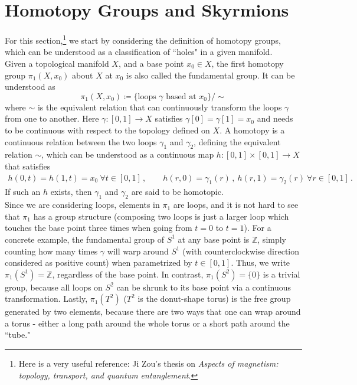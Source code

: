 \documentclass[11pt, onesided]{book}
\theoremstyle{break}
\theoremstyle{break}
\newcommand{\Z}{\mathbb{Z}}
\begin{document}
\section{Homotopy Groups and Skyrmions}
For this section,\footnote{Here is a very useful reference: Ji Zou's thesis on \textit{Aspects of magnetism: topology, transport, and quantum entanglement}.} we start by considering the definition of homotopy groups, which can be understood as a classification of ``holes" in a given manifold.\\

Given a topological manifold $X$, and a base point $x_0 \in X$, the first homotopy group $\pi_1(X,x_0)$ about $X$ at $x_0$ is also called the fundamental group. It can be understood as 
$$\pi_1(X,x_0)\coloneqq \{\text{loops\ }\gamma \text{ based at }x_0\} / \sim$$
where $\sim$ is the equivalent relation that can continuously transform the loops $\gamma$ from one to another. Here $\gamma:[0,1]\to X$ satisfies $\gamma[0] = \gamma[1] = x_0$ and needs to be continuous with respect to the topology defined on $X$. A homotopy is a continuous relation between the two loops $\gamma_1$ and $\gamma_2$, defining the equivalent relation $\sim$, which can be understood as a continuous map $h:[0,1]\times [0,1] \to X$ that satisfies
\begin{align*}
h(0,t)=h(1,t) = x_0 \ \forall t \in [0,1]\,,\qquad
h(r,0) = \gamma_1(r) \,,\ h(r,1) = \gamma_2(r)\ \forall r \in [0,1]\,.
\end{align*}
If such an $h$ exists, then $\gamma_1$ and $\gamma_2$ are said to be homotopic.\\

Since we are considering loops, elements in $\pi_1$ are loops, and it is not hard to see that $\pi_1$ has a group structure (composing two loops is just a larger loop which touches the base point three times when going from $t = 0$ to $t = 1$). For a concrete example, the fundamental group of $S^1$ at any base point is $\Z$, simply counting how many times $\gamma$ will warp around $S^1$ (with counterclockwise direction considered as positive count) when parametrized by $t \in [0,1]$. Thus, we write $\pi_1(S^1) = \Z$, regardless of the base point. In contrast, $\pi_1(S^2) = \{0\}$ is a trivial group, because all loops on $S^2$ can be shrunk to its base point via a continuous transformation. Lastly, $\pi_1(T^2)$ ($T^2$ is the donut-shape torus) is the free group generated by two elements, because there are two ways that one can wrap around a torus - either a long path around the whole torus or a short path around the ``tube."\\
\end{document}
